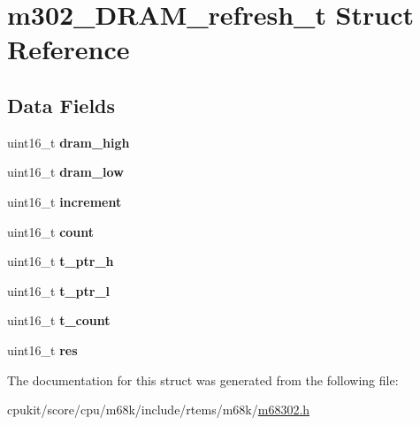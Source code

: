 \hypertarget{structm302__DRAM__refresh__t}{}\section{m302\+\_\+\+D\+R\+A\+M\+\_\+refresh\+\_\+t Struct Reference}
\label{structm302__DRAM__refresh__t}
\subsection*{Data Fields}
\begin{DoxyCompactItemize}
\item 
\mbox{\label{structm302__DRAM__refresh__t_a72482f869c3dbf8550a4b96bffc1127a}} 
uint16\+\_\+t {\bfseries dram\+\_\+high}
\item 
\mbox{\label{structm302__DRAM__refresh__t_ad680b36b6054b67e3f281c65631b7183}} 
uint16\+\_\+t {\bfseries dram\+\_\+low}
\item 
\mbox{\label{structm302__DRAM__refresh__t_a7389b1a364aeea9a0c9423522c2360b2}} 
uint16\+\_\+t {\bfseries increment}
\item 
\mbox{\label{structm302__DRAM__refresh__t_ab96fd56389023668f63a5087e2e1e807}} 
uint16\+\_\+t {\bfseries count}
\item 
\mbox{\label{structm302__DRAM__refresh__t_aca1fae5e3a66157448ca379ec755b7f4}} 
uint16\+\_\+t {\bfseries t\+\_\+ptr\+\_\+h}
\item 
\mbox{\label{structm302__DRAM__refresh__t_a23419eb3d7e4215fcb7aa78c60b06a55}} 
uint16\+\_\+t {\bfseries t\+\_\+ptr\+\_\+l}
\item 
\mbox{\label{structm302__DRAM__refresh__t_a4f14fe477eb7b7406dede40a1bfe8ddc}} 
uint16\+\_\+t {\bfseries t\+\_\+count}
\item 
\mbox{\label{structm302__DRAM__refresh__t_a385050615a8f1be176c9db697bfa7ff8}} 
uint16\+\_\+t {\bfseries res}
\end{DoxyCompactItemize}


The documentation for this struct was generated from the following file\+:\begin{DoxyCompactItemize}
\item 
cpukit/score/cpu/m68k/include/rtems/m68k/\mbox{\hyperlink{m68302_8h}{m68302.\+h}}\end{DoxyCompactItemize}
